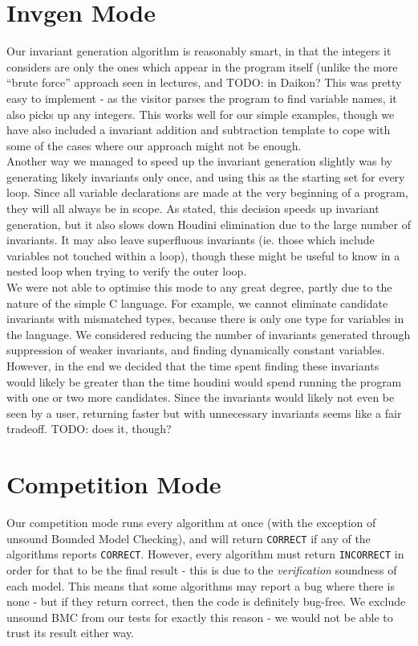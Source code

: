 \documentclass[11pt]{article}
\begin{document}
\section{Invgen Mode}

Our invariant generation algorithm is reasonably smart, in that the integers it considers are only the ones which appear in the program itself (unlike the more ``brute force'' approach seen in lectures, and TODO: in Daikon? This was pretty easy to implement - as the visitor parses the program to find variable names, it also picks up any integers. This works well for our simple examples, though we have also included a invariant addition and subtraction template to cope with some of the cases where our approach might not be enough. \\

Another way we managed to speed up the invariant generation slightly was by generating likely invariants only once, and using this as the starting set for every loop. Since all variable declarations are made at the very beginning of a program, they will all always be in scope. As stated, this decision speeds up invariant generation, but it also slows down Houdini elimination due to the large number of invariants. It may also leave superfluous invariants (ie. those which include variables not touched within a loop), though these might be useful to know in a nested loop when trying to verify the outer loop. \\

We were not able to optimise this mode to any great degree, partly due to the nature of the simple C language. For example, we cannot eliminate candidate invariants with mismatched types, because there is only one type for variables in the language. We considered reducing the number of invariants generated through suppression of weaker invariants, and finding dynamically constant variables. However, in the end we decided that the time spent finding these invariants would likely be greater than the time houdini would spend running the program with one or two more candidates. Since the invariants would likely not even be seen by a user, returning faster but with unnecessary invariants seems like a fair tradeoff. TODO: does it, though? \\

\section{Competition Mode}

Our competition mode runs every algorithm at once (with the exception of unsound Bounded Model Checking), and will return \verb|CORRECT| if any of the algorithms reports \verb|CORRECT|. However, every algorithm must return \verb|INCORRECT| in order for that to be the final result - this is due to the \emph{verification} soundness of each model. This means that some algorithms may report a bug where there is none - but if they return correct, then the code is definitely bug-free. We exclude unsound BMC from our tests for exactly this reason - we would not be able to trust its result either way. \\
\end{document}
